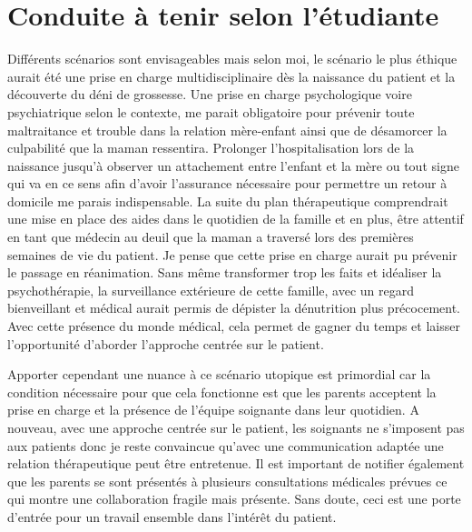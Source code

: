 \section{Conduite à tenir selon l’étudiante }

Différents scénarios sont envisageables mais selon moi, le scénario le plus éthique aurait été une prise en charge multidisciplinaire dès la naissance du patient et la découverte du déni de grossesse. Une prise en charge psychologique voire psychiatrique selon le contexte, me parait obligatoire pour prévenir toute maltraitance et trouble dans la relation mère-enfant ainsi que de désamorcer la culpabilité que la maman ressentira. Prolonger l’hospitalisation lors de la naissance jusqu’à observer un attachement entre l’enfant et la mère ou tout signe qui va en ce sens afin d’avoir l’assurance nécessaire pour permettre un retour à domicile me parais indispensable. La suite du plan thérapeutique comprendrait une mise en place des aides dans le quotidien de la famille et en plus, être attentif en tant que médecin au deuil que la maman a traversé lors des premières semaines de vie du patient. Je pense que cette prise en charge aurait pu prévenir le passage en réanimation. Sans même transformer trop les faits et idéaliser la psychothérapie, la surveillance extérieure de cette famille, avec un regard bienveillant et médical aurait permis de dépister la dénutrition plus précocement. Avec cette présence du monde médical, cela permet de gagner du temps et laisser l’opportunité d’aborder l’approche centrée sur le patient.

Apporter cependant une nuance à ce scénario utopique est primordial car la condition nécessaire pour que cela fonctionne est que les parents acceptent la prise en charge et la présence de l’équipe soignante dans leur quotidien. A nouveau, avec une approche centrée sur le patient, les soignants ne s’imposent pas aux patients donc je reste convaincue qu’avec une communication adaptée une relation thérapeutique peut être entretenue. Il est important de notifier également que les parents se sont présentés à plusieurs consultations médicales prévues ce qui montre une collaboration fragile mais présente. Sans doute, ceci est une porte d’entrée pour un travail ensemble dans l’intérêt du patient.

